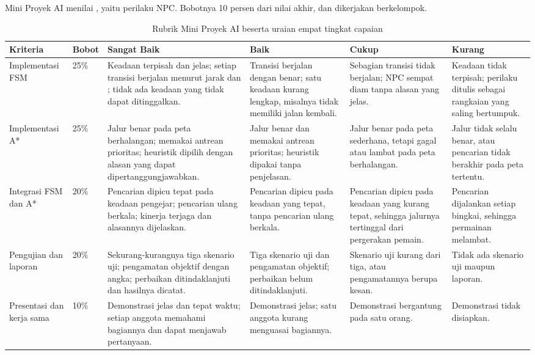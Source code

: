 Mini Proyek AI menilai , yaitu perilaku NPC. Bobotnya 10 persen dari
nilai akhir, dan dikerjakan berkelompok.

\begin{landscape}
\begin{table}[htbp]
\centering
\caption{Rubrik Mini Proyek AI beserta uraian empat tingkat capaian}
\label{tab:rubrik-mini-lengkap}
{\setlength{\tabcolsep}{4pt}\footnotesize%
\begin{tabularx}{\linewidth}{@{}L{2.8cm} C{1.3cm} Y Y Y Y@{}}
\toprule
\headrow \textbf{Kriteria} & \textbf{Bobot} & \textbf{Sangat Baik} & \textbf{Baik} & \textbf{Cukup} & \textbf{Kurang} \\
\midrule
Implementasi FSM & 25\% &
Keadaan terpisah dan jelas; setiap transisi berjalan menurut jarak dan
; tidak ada keadaan yang tidak dapat ditinggalkan. &
Transisi berjalan dengan benar; satu keadaan kurang lengkap, misalnya tidak
memiliki jalan kembali. &
Sebagian transisi tidak berjalan; NPC sempat diam tanpa alasan yang jelas. &
Keadaan tidak terpisah; perilaku ditulis sebagai rangkaian  yang
saling bertumpuk. \\
\addlinespace
Implementasi A* & 25\% &
Jalur benar pada peta berhalangan; memakai antrean prioritas; heuristik
dipilih dengan alasan yang dapat dipertanggungjawabkan. &
Jalur benar dan memakai antrean prioritas; heuristik dipakai tanpa penjelasan. &
Jalur benar pada peta sederhana, tetapi gagal atau lambat pada peta
berhalangan. &
Jalur tidak selalu benar, atau pencarian tidak berakhir pada peta tertentu. \\
\addlinespace
Integrasi FSM dan A* & 20\% &
Pencarian dipicu tepat pada keadaan pengejar; pencarian ulang berkala; kinerja
terjaga dan alasannya dijelaskan. &
Pencarian dipicu pada keadaan yang tepat, tanpa pencarian ulang berkala. &
Pencarian dipicu pada keadaan yang kurang tepat, sehingga jalurnya tertinggal
dari pergerakan pemain. &
Pencarian dijalankan setiap bingkai, sehingga permainan melambat. \\
\addlinespace
Pengujian dan laporan & 20\% &
Sekurang-kurangnya tiga skenario uji; pengamatan objektif dengan angka;
perbaikan ditindaklanjuti dan hasilnya dicatat. &
Tiga skenario uji dan pengamatan objektif; perbaikan belum ditindaklanjuti. &
Skenario uji kurang dari tiga, atau pengamatannya berupa kesan. &
Tidak ada skenario uji maupun laporan. \\
\addlinespace
Presentasi dan kerja sama & 10\% &
Demonstrasi jelas dan tepat waktu; setiap anggota memahami bagiannya dan dapat
menjawab pertanyaan. &
Demonstrasi jelas; satu anggota kurang menguasai bagiannya. &
Demonstrasi bergantung pada satu orang. &
Demonstrasi tidak disiapkan. \\
\bottomrule
\end{tabularx}}
\end{table}
\end{landscape}

